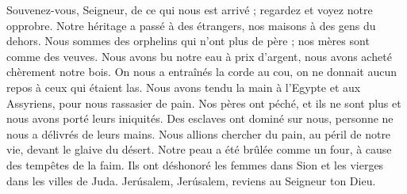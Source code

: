 Souvenez-vous, Seigneur, de ce qui nous est arrivé ; regardez et voyez notre opprobre.
\versseparator
Notre héritage a passé à des étrangers, nos maisons à des gens du dehors.
\versseparator
Nous sommes des orphelins qui n'ont plus de père ; nos mères sont comme des veuves.
\versseparator
Nous avons bu notre eau à prix d'argent, nous avons acheté chèrement notre bois.
\versseparator
On nous a entraînés la corde au cou, on ne donnait aucun repos à ceux qui étaient las.
\versseparator
Nous avons tendu la main à l'Egypte et aux Assyriens, pour nous rassasier de pain.
\versseparator
Nos pères ont péché, et ils ne sont plus et nous avons porté leurs iniquités.
\versseparator
Des esclaves ont dominé sur nous, personne ne nous a délivrés de leurs mains.
\versseparator
Nous allions chercher du pain, au péril de notre vie, devant le glaive du désert.
\versseparator
Notre peau a été brûlée comme un four, à cause des tempêtes de la faim.
\versseparator
Ils ont déshonoré les femmes dans Sion et les vierges dans les villes de Juda.
\versseparator
Jerúsalem, Jerúsalem, reviens au Seigneur ton Dieu.